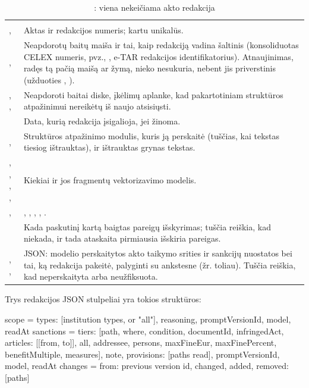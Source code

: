 \begin{xltabular}{\textwidth}{@{}L{38mm}Y@{}}
\caption{: viena nekeičiama akto redakcija}\label{tab:data:lv}\\
\toprule
{} &  \\
\midrule
\endfirsthead
\toprule
{} &  \\
\midrule
\endhead
\bottomrule
\endlastfoot
{},  & Aktas ir redakcijos numeris; kartu unikalūs. \\
,  & Neapdorotų baitų maiša ir tai, kaip redakciją vadina šaltinis (konsoliduotas CELEX numeris, pvz., , e-TAR redakcijos identifikatorius). Atnaujinimas, radęs tą pačią maišą ar žymą, nieko nesukuria, nebent jis priverstinis (užduoties , ). \\
, ,  & Neapdoroti baitai diske, įkėlimų aplanke, kad pakartotiniam struktūros atpažinimui nereikėtų iš naujo atsisiųsti. \\
 & Data, kurią redakcija įsigalioja, jei žinoma. \\
,  & Struktūros atpažinimo modulis, kuris ją perskaitė (tuščias, kai tekstas tiesiog ištrauktas), ir ištrauktas grynas tekstas. \\
, , , ,  & Kiekiai ir jos fragmentų vektorizavimo modelis. \\
,  & , , , , . \\
 & Kada paskutinį kartą baigtas pareigų išskyrimas; tuščia reiškia, kad niekada, ir tada ataskaita pirmiausia išskiria pareigas. \\
, ,  & JSON: modelio perskaitytos akto taikymo srities ir sankcijų nuostatos bei tai, ką redakcija pakeitė, palyginti su ankstesne (žr. toliau). Tuščia reiškia, kad neperskaityta arba neužfiksuota. \\
\end{xltabular}

Trys redakcijos JSON stulpeliai yra tokios struktūros:

\begin{codeblock}
scope     = {types: [institution types, or "all"], reasoning,
             promptVersionId, model, readAt}
sanctions = {tiers: [{path, where, condition, documentId, infringedAct,
                      articles: [[from, to]], all, addressee, persons,
                      maxFineEur, maxFinePercent, benefitMultiple, measures}],
             note, provisions: [paths read], promptVersionId, model, readAt}
changes   = {from: previous version id, changed, added, removed: [paths]}
\end{codeblock}

